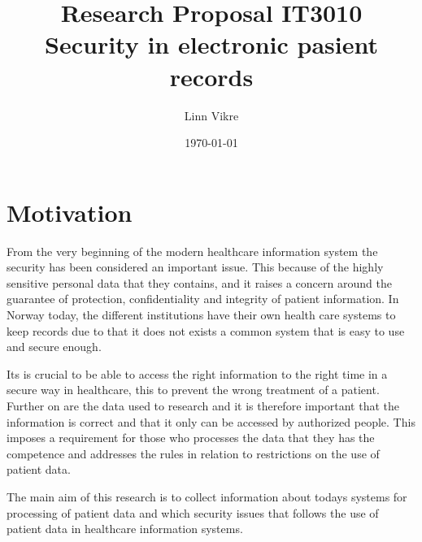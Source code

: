 \documentclass[11pt, a4paper]{article}
\title{Research Proposal IT3010\\ Security in electronic pasient records}
\author{Linn Vikre}
\date{\today}
\begin{document}
\maketitle
\section{Motivation}
From the very beginning of the modern healthcare information system the security has been considered an important issue. This because of the highly sensitive personal data that they contains, and it raises a concern around the guarantee of protection, confidentiality and integrity of patient information\cite{Smith199939}. In Norway today, the different institutions have their own health care systems to keep records due to that it does not exists a common system that is easy to use and secure enough.

Its is crucial to be able to access the right information to the right time in a secure way in healthcare, this to prevent the wrong treatment of a patient. Further on are the data used to research and it is therefore important that the information is correct and that it only can be accessed by authorized people. This imposes a requirement for those who processes the data that they has the competence and addresses the rules in relation to restrictions on the use of patient data\cite{faxvaag2007er}. 

The main aim of this research is to collect information about todays systems for processing of patient data and which security issues that follows the use of patient data in healthcare information systems.


%
\end{document}
